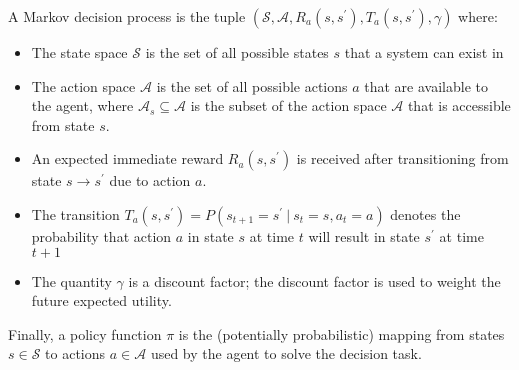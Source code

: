 \documentclass[11pt]{article}
\theoremstyle{definition}
\begin{document}
\begin{definition}
A Markov decision process is the tuple $\left(\mathcal{S}, \mathcal{A}, R_{a}\left(s, s^{\prime}\right), T_{a}\left(s,s^{\prime}\right), \gamma\right)$ where:
\begin{itemize}
\item{The state space $\mathcal{S}$ is the set of all possible states $s$ that a system can exist in}
\item{The action space $\mathcal{A}$ is the set of all possible actions $a$ that are available to the agent, where $\mathcal{A}_{s} \subseteq \mathcal{A}$ is the subset of the action space $\mathcal{A}$ that is accessible from state $s$.}
\item{An expected immediate reward $R_{a}\left(s, s^{\prime}\right)$ is received after transitioning from state $s\rightarrow{s}^{\prime}$ due to action $a$.}
\item{The transition $T_{a}\left(s,s^{\prime}\right) = P(s_{t+1} = s^{\prime}~|~s_{t}=s,a_{t} = a)$ denotes the probability that action $a$ in state $s$ at time $t$ will result in state $s^{\prime}$ at time $t+1$}
\item{The quantity $\gamma$ is a discount factor; the discount factor is used to weight the future expected utility.}
\end{itemize}
Finally, a policy function $\pi$ is the (potentially probabilistic) mapping from states $s\in\mathcal{S}$ to actions $a\in\mathcal{A}$ used by the agent to solve the decision task. 
\end{definition}
\end{document}
